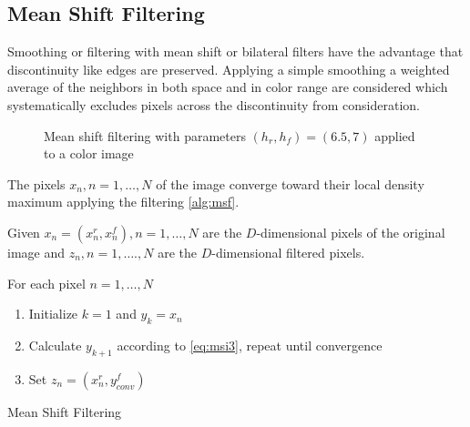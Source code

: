 \subsection{Mean Shift Filtering} %
\label{sub:mean_shift_filtering}
Smoothing or filtering with mean shift or bilateral filters have the advantage
that discontinuity like edges are preserved. Applying a simple smoothing a 
weighted average of the neighbors in both space and in color range are considered
which systematically excludes pixels across the discontinuity from consideration.

\begin{figure}[ht]
\centering
{}%
%
\caption{Mean shift filtering with parameters $(h_r, h_f) = (6.5, 7)$ applied to a color image}
\label{fig:filtsample}
\end{figure}

The pixels $x_n, n = 1, \ldots, N$ of the image converge toward their local density
maximum applying the filtering  \autoref{alg:msf}. 

\begin{algorithm2e}[H]
Given $x_n = (x_n^r, x_n^f), n = 1, \ldots , N$ are the $D$-dimensional pixels
of the original image and $z_n, n = 1 , \ldots. , N$ are the $D$-dimensional
filtered pixels.

For each pixel $n = 1, \ldots , N$
\begin{enumerate}%
 \item Initialize $k = 1$ and $y_k = x_n$
 \item Calculate $y_{k+1}$ according to \autoref{eq:msi3}, repeat until 
	convergence
 \item Set $z_n = (x_n^r, y_{conv}^f)$
\end{enumerate}

\caption{Mean Shift Filtering}
\label{alg:msf}
\end{algorithm2e}


